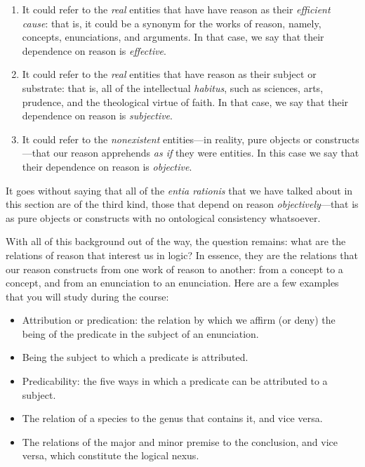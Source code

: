 \documentclass[
  12pt,
]{memoir}
\providecommand{\tightlist}{%
  \setlength{\itemsep}{0pt}\setlength{\parskip}{0pt}}
\begin{document}
\begin{enumerate}
\def\labelenumi{\arabic{enumi}.}
\item
  It could refer to the \emph{real} entities that have have reason as
  their \emph{efficient cause}: that is, it could be a synonym for the
  works of reason, namely, concepts, enunciations, and arguments. In
  that case, we say that their dependence on reason is \emph{effective}.
\item
  It could refer to the \emph{real} entities that have reason as their
  subject or substrate: that is, all of the intellectual \emph{habitus},
  such as sciences, arts, prudence, and the theological virtue of faith.
  In that case, we say that their dependence on reason is
  \emph{subjective}.
\item
  It could refer to the \emph{nonexistent} entities---in reality, pure
  objects or constructs---that our reason apprehends \emph{as if} they
  were entities. In this case we say that their dependence on reason is
  \emph{objective}.
\end{enumerate}

\noindent It goes without saying that all of the \emph{entia rationis}
that we have talked about in this section are of the third kind, those
that depend on reason \emph{objectively}---that is as pure objects or
constructs with no ontological consistency whatsoever.

With all of this background out of the way, the question remains: what
are the relations of reason that interest us in logic? In essence, they
are the relations that our reason constructs from one work of reason to
another: from a concept to a concept, and from an enunciation to an
enunciation. Here are a few examples that you will study during the
course:

\begin{itemize}
\tightlist
\item
  Attribution or predication: the relation by which we affirm (or deny)
  the being of the predicate in the subject of an enunciation.
\item
  Being the subject to which a predicate is attributed.
\item
  Predicability: the five ways in which a predicate can be attributed to
  a subject.
\item
  The relation of a species to the genus that contains it, and vice
  versa.
\item
  The relations of the major and minor premise to the conclusion, and
  vice versa, which constitute the logical nexus.
\end{itemize}
\end{document}
